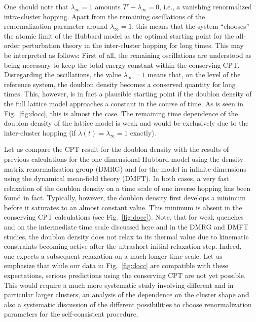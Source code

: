 \documentclass[twocolumn,prb,showpacs,aps,superscriptaddress]{revtex4}
\begin{document}
One should note that $\lambda_\infty = 1$ amounts $T' - \lambda_{\infty} = 0$,
i.e., a vanishing renormalized intra-cluster hopping.  Apart from the remaining
oscillations of the renormalization parameter around $\lambda_\mathrm{\infty} =
1$, this means that the system ``chooses'' the atomic limit of the Hubbard
model as the optimal starting point for the all-order perturbation theory in
the inter-cluster hopping for long times.  This may be interpreted as follows:
First of all, the remaining oscillations are understood as being necessary to
keep the total energy constant within the conserving CPT.  Disregarding the
oscillations, the value $\lambda_\mathrm{\infty} = 1$ means that, on the level
of the reference system, the doublon density becomes a conserved quantity for
long times.  This, however, is in fact a plausible starting point if the
doublon density of the full lattice model approaches a constant in the course
of time.  As is seen in Fig.\ \ref{fig:docc}, this is almost the case.  The
remaining time dependence of the doublon density of the lattice model is weak
and would be exclusively due to the inter-cluster hopping (if $\lambda(t) =
\lambda_\mathrm{\infty} = 1$ exactly).  

Let us compare the CPT result for the doublon density with the results of
previous calculations for the one-dimensional Hubbard model \cite{RP17} using
the density-matrix renormalization group (DMRG) and for the model in infinite
dimensions using the dynamical mean-field theory (DMFT). \cite{EKW09} In both
cases, a very fast relaxation of the doublon density on a time scale of one
inverse hopping has been found in fact.  Typically, however, the doublon
density first develops a minimum before it saturates to an almost constant
value.  This minimum is absent in the conserving CPT calculations (see Fig.\
\ref{fig:docc}).  Note, that for weak quenches and on the intermediate time scale discussed here and in the DMRG and DMFT studies, the doublon density does not relax to its thermal value due to kinematic constraints becoming active after the ultrashort initial relaxation step. \cite{MK08,KPD+17} 
Indeed, one expects a subsequent relaxation on a much longer time scale.  
Let us emphasize that while our data in Fig.\ \ref{fig:docc} are compatible with these expectations, serious predictions
using the conserving CPT are not yet possible.  
This would require a much more systematic study involving different and in particular larger clusters, an
analysis of the dependence on the cluster shape and also a systematic
discussion of the different possibilities to choose renormalization parameters
for the self-consistent procedure.
\end{document}
